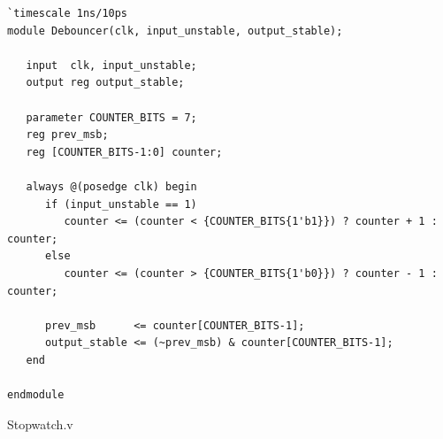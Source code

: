 \documentclass[11pt,a4paper]{article}
\begin{document}
\begin{lstlisting}
`timescale 1ns/10ps
module Debouncer(clk, input_unstable, output_stable);

   input  clk, input_unstable;
   output reg output_stable;

   parameter COUNTER_BITS = 7;
   reg prev_msb;
   reg [COUNTER_BITS-1:0] counter;

   always @(posedge clk) begin
      if (input_unstable == 1)
         counter <= (counter < {COUNTER_BITS{1'b1}}) ? counter + 1 : counter;
      else
         counter <= (counter > {COUNTER_BITS{1'b0}}) ? counter - 1 : counter;

      prev_msb      <= counter[COUNTER_BITS-1];
      output_stable <= (~prev_msb) & counter[COUNTER_BITS-1];
   end

endmodule
\end{lstlisting}

\clearpage
Stopwatch.v
\end{document}
